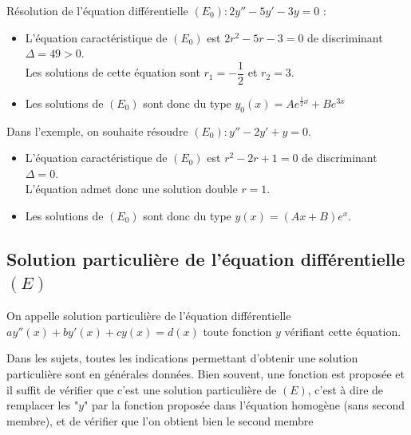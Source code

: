\documentclass[french]{book}
\begin{document}
\begin{exemple}
   Résolution de l'équation différentielle $(E_0):2y''-5y'-3y=0$ :
   \begin{itemize}
      \item L'équation caractéristique de $(E_0)$ est $2r^2-5r-3 =0$ de discriminant $\Delta =49 >0$. \\
      \hspace*{0.3cm} Les solutions de cette équation sont $r_1 =-\dfrac12$ et $r_2 =3$.
      \item Les solutions de $(E_0)$ sont donc du type $y_0(x) =Ae^{\frac12x}+Be^{3x}$
   \end{itemize}
\end{exemple}


\begin{exemple}
Dans l'exemple, on souhaite résoudre $(E_0):y''-2y'+y =0$.
\begin{itemize}
      \item L'équation caractéristique de $(E_0)$ est $r^2-2r+1 =0$ de discriminant $\Delta =0$. \\
      \hspace*{0.3cm} L'équation admet donc une solution double $r =1$.
      \item Les solutions de $(E_0)$ sont donc du type $y(x) =(Ax+B)e^x$.
   \end{itemize}
\end{exemple}


\subsection{Solution particulière de l'équation différentielle $(E)$}

\begin{defn}
On appelle solution particulière de l'équation différentielle $ay''(x)+by'(x)+cy(x)= d(x)$ toute fonction $y$ vérifiant cette équation.
\end{defn}

Dans les sujets, toutes les indications permettant d'obtenir une solution particulière sont en générales données. Bien souvent, une fonction est proposée et il suffit de vérifier que c'est une solution particulière de $(E)$, c'est à dire de remplacer les "$y$" par la fonction proposée dans l'équation homogène (sans second membre), et de vérifier que l'on obtient bien le second membre
\end{document}
